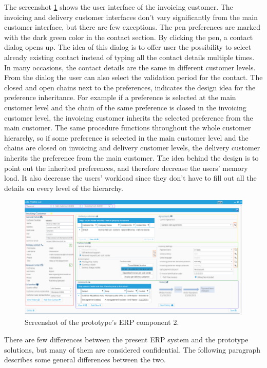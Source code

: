 \documentclass[12pt,a4paper,oneside,pdftex]{report}
\begin{document}
The screenshot \ref{fig:prototwoimg} shows the user interface of the invoicing customer. The invoicing and delivery customer interfaces don't vary significantly from the main customer interface, but there are few exceptions. The pen preferences are marked with the dark green color in the contact section. By clicking the pen, a contact dialog opens up. The idea of this dialog is to offer user the possibility to select already existing contact instead of typing all the contact details multiple times. In many occasions, the contact details are the same in different customer levels. From the dialog the user can also select the validation period for the contact. The closed and open chains next to the preferences, indicates the design idea for the preference inheritance. For example if a preference is selected at the main customer level and the chain of the same preference is closed in the invoicing customer level, the invoicing customer inherits the selected preference from the main customer. The same procedure functions throughout the whole customer hierarchy, so if some preference is selected in the main customer level and the chains are closed on invoicing and delivery customer levels, the delivery customer inherits the preference from the main customer. The idea behind the design is to point out the inherited preferences, and therefore decrease the users' memory load. It also decrease the users' workload since they don't have to fill out all the details on every level of the hierarchy.   

\begin{figure}[H]
  	\centerline{
    	   \includegraphics[width=1.3\textwidth]{./images/proto_invoicing.png}
    	   }
  	   \caption{Screenshot of  the prototype's ERP component 2.}
	   \label{fig:prototwoimg}
\end{figure}

There are few differences between the present ERP system and the prototype solutions, but many of them are considered confidential. The following paragraph describes some general differences between the two.
\end{document}
